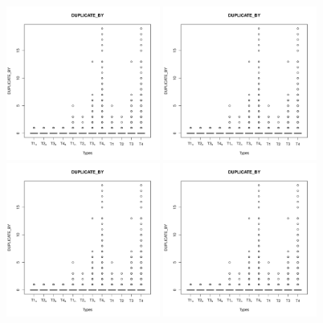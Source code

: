 \documentclass[natbib]{svjour3}
\begin{document}
\begin{figure}
\centering
\includegraphics[page=1, width=0.45\textwidth]{extract/Rplots}
\includegraphics[page=2, width=0.45\textwidth]{extract/Rplots} \\
\includegraphics[page=3, width=0.45\textwidth]{extract/Rplots}
\includegraphics[page=4, width=0.45\textwidth]{extract/Rplots} \\

\end{figure}
\end{document}
